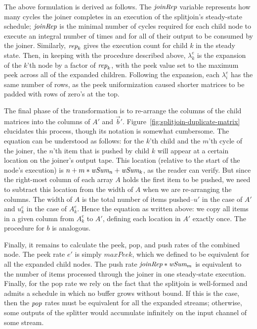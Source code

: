 The above formulation is derived as follows.  The $\mbox{\it joinRep}$
variable represents how many cycles the joiner completes in an
execution of the splitjoin's steady-state schedule; $\mbox{\it joinRep}$ is
the minimal number of cycles required for each child node to execute
an integral number of times and for all of their output to be consumed
by the joiner.  Similarly, $\mbox{\it rep}_k$ gives the execution count for
child $k$ in the steady state.  Then, in keeping with the procedure
described above, $\lambda_k^e$ is the expansion of the $k$'th node by
a factor of $\mbox{\it rep}_k$, with the peek value set to the maximum peek
across all of the expanded children.  Following the expansion, each
$\lambda_i^e$ has the same number of rows, as the peek uniformization
caused shorter matrices to be padded with rows of zero's at the top.

The final phase of the transformation is to re-arrange the columns of
the child matrices into the columns of $A'$ and $\vec{b}'$.
Figure~\ref{fig:splitjoin-duplicate-matrix} elucidates this process,
though its notation is somewhat cumbersome.  The equation can be
understood as follows: for the $k$'th child and the $m$'th cycle of
the joiner, the $n$'th item that is pushed by child $k$ will
appear at a certain location on the joiner's output tape.  This
location (relative to the start of the node's execution) is $n + m *
\mbox{\it wSum}_n + \mbox{\it wSum}_k$, as the reader can verify.  But since the
right-most column of each array $A$ holds the first item to be pushed,
we need to subtract this location from the width of $A$ when we are
re-arranging the columns.  The width of $A$ is the total number of
items pushed--$u'$ in the case of $A'$ and $u_k^e$ in the case of
$A_k^e$.  Hence the equation as written above: we copy all items in a
given column from $A_k^e$ to $A'$, defining each location in $A'$
exactly once.  The procedure for $b$ is analogous.

Finally, it remains to calculate the peek, pop, and push rates of the
combined node.  The peek rate $e'$ is simply $maxPeek$, which we
defined to be equivalent for all the expanded child nodes.  The push
rate $\mbox{\it joinRep}*\mbox{\it wSum}_m$ is equivalent to the number of items
processed through the joiner in one steady-state execution.  Finally,
for the pop rate we rely on the fact that the splitjoin is well-formed
and admits a schedule in which no buffer grows without bound.  If this
is the case, then the $\mbox{\it pop}$ rates must be equivalent for all the
expanded streams; otherwise, some outputs of the splitter would
accumulate infinitely on the input channel of some stream.  

